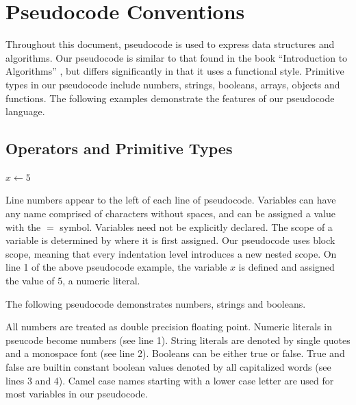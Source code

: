 
\section{Pseudocode Conventions}
Throughout this document, pseudocode is used to express data structures and algorithms. Our pseudocode is similar to that found in the book ``Introduction to Algorithms'' \cite{cormen2009introduction}, but differs significantly in that it uses a functional style. Primitive types in our pseudocode include numbers, strings, booleans, arrays, objects and functions. The following examples demonstrate the features of our pseudocode language.

\subsection{Operators and Primitive Types}

\begin{codebox}
\li $x \gets 5$
\end{codebox}

Line numbers appear to the left of each line of pseudocode. Variables can have any name comprised of characters without spaces, and can be assigned a value with the $=$ symbol. Variables need not be explicitly declared. The scope of a variable is determined by where it is first assigned. Our pseudocode uses block scope, meaning that every indentation level introduces a new nested scope. On line 1 of the above pseudocode example, the variable $x$ is defined and assigned the value of $5$, a numeric literal.

The following pseudocode demonstrates numbers, strings and booleans.


All numbers are treated as double precision floating point. Numeric literals in pseucode become numbers (see line 1). String literals are denoted by single quotes and a monospace font (see line 2). Booleans can be either true or false. True and false are builtin constant boolean values denoted by all capitalized words (see lines 3 and 4). Camel case names starting with a lower case letter are used for most variables in our pseudocode.

